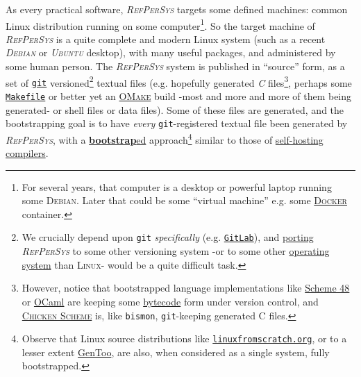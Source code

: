 \documentclass{IEEEtran}
\newcommand{\RefPerSys}{{\textit{\textsc{RefPerSys}}}}
\begin{document}
As every practical software, {\RefPerSys} targets some defined
machines: common Linux distribution running on some
computer\footnote{For several years, that computer is a desktop or
powerful laptop running some \textsc{Debian}. Later that could be some
``virtual machine'' e.g. some
\href{https://www.docker.com/}{\textsc{Docker}} container.}. So the
target machine of {\RefPerSys} is a quite complete and modern Linux
system (such as a recent \textit{\textsc{Debian}} or
\textit{\textsc{Ubuntu}} desktop), with many useful packages, and
administered by some human person. The {\RefPerSys} system is published in
``source'' form, as a set of \href{http://git-scm.com/}{\texttt{git}}
versioned\footnote{We crucially depend upon \texttt{git}
\emph{specifically} (e.g. \href{http://gitlab.org/}{\texttt{GitLab}}),
and \href{https://en.wikipedia.org/wiki/Porting}{porting} {\RefPerSys}
to some other versioning system -or to some other
\href{http://pages.cs.wisc.edu/~remzi/OSTEP/}{operating system} than
\textsc{Linux}- would be a quite difficult task.} textual files
(e.g. hopefully generated \textit{C} files\footnote{However, notice that
bootstrapped language implementations like
\href{http://s48.org/}{Scheme 48} or \href{https://ocaml.org/}{OCaml}
are keeping some
\href{https://en.wikipedia.org/wiki/Bytecode}{bytecode} form under
version control, and \href{https://www.call-cc.org/}{\textsc{Chicken
    Scheme}} is, like \texttt{bismon}, \texttt{git}-keeping generated
C files.}, perhaps some
\href{https://en.wikipedia.org/wiki/Makefile}{\texttt{Makefile}} or
better yet an
\href{http://projects.camlcity.org/projects/omake.html}{\textsc{OMake}}
build -most and more and more of them being generated- or shell files or
data files). Some of these files are generated, and the bootstrapping
goal is to have \emph{every} \texttt{git}-registered textual file been
generated by {\RefPerSys}, with a
\href{https://en.wikipedia.org/wiki/Bootstrapping\_(compilers)}{\textbf{bootstrap}ed}
approach\footnote{Observe that Linux source distributions like \href{http://www.linuxfromscratch.org/}{\texttt{linuxfromscratch.org}}, or to a lesser extent \href{https://www.gentoo.org/}{GenToo}, are also, when considered as a single system, fully bootstrapped.} similar to those of
\href{https://en.wikipedia.org/wiki/Self-hosting_(compilers)}{self-hosting
  compilers}.
\medskip
\end{document}
